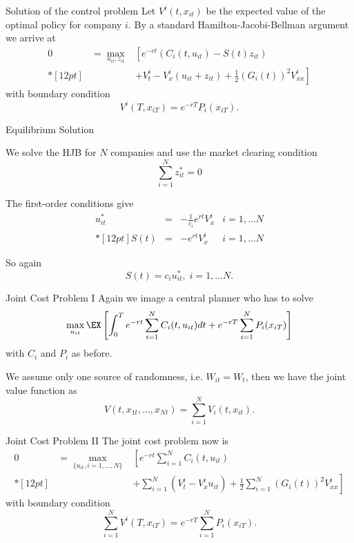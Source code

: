 {Solution of the control problem}
Let $V^i(t,x_{it})$ be the expected value of the optimal policy for company $i$. By a standard
Hamilton-Jacobi-Bellman argument we arrive at
$$
\begin{array}{lll}
0&=\max_{u_{it},z_{it}}&\left[e^{-rt}(C_i(t,u_{it}) - S(t) z_{it})\right.\\*[12pt]
&&+\left.V^i_t -V_x^i(u_{it}+z_{it}) + \frac{1}{2}(G_i(t))^2 V^i_{xx}\right]
\end{array}
$$
with boundary condition
$$
V^i(T, x_{iT})=e^{-rT}P_i(x_{iT}).
$$

{Equilibrium Solution}


	We solve the HJB for $N$ companies and use the market clearing condition
$$
\sum_{i=1}^N z_{it}^*=0
$$

	The first-order conditions give
$$
\begin{array}{llll}
u_{it}^* &=& -\frac{1}{c_i} e^{rt} V^i_x & i=1, \ldots N \\*[12pt]
S(t) &=& - e^{rt} V^i_{x} & i=1, \ldots N
\end{array}
$$

	So again
$$
S(t) = c_i u_{it}^*, \; i=1, \ldots N.
$$


{Joint Cost Problem I}
Again we image a central planner who has to solve
\begin{equation}
\max_{u_{it}} \EX\left[\int_0^Te^{-rt}\sum_{i=1}^N C_i(t,u_{it})dt + e^{-rT} \sum_{i=1}^N P_i(x_{iT})\right]
\end{equation}
with $C_i$ and $P_i$ as before.

We assume only one source of randomness, i.e. $W_{it}= W_t$, then we have the  joint value function as
$$
V(t, x_{1t}, \ldots, x_{Nt}) = \sum_{i=1}^N V_i(t,x_{it}).
$$


{Joint Cost Problem II}
The joint cost problem now is
$$
\begin{array}{lll}
0&=\displaystyle \max_{\{u_{it},i=1, \ldots, N\}}&\displaystyle \left[e^{-rt}\sum_{i=1}^N C_i(t,u_{it})\right.\\*[12pt]
&&+\displaystyle \left.\sum_{i=1}^N (V^i_t -V_x^iu_{it}) + \frac{1}{2}\sum_{i=1}^N(G_i(t))^2 V^i_{xx}\right]
\end{array}
$$
with boundary condition
$$
\sum_{i=1}^N V^i(T, x_{iT})=e^{-rT}\sum_{i=1}^N P_i(x_{iT}).
$$

